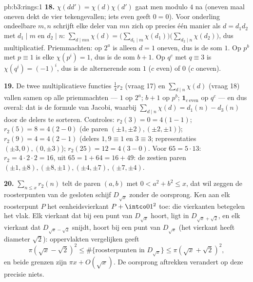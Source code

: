 \begin{solution}{pb:b3:rings:1}
\textbf{18.} $\chi(dd') = \chi(d)\chi(d')$ gaat men modulo $4$ na
(oneven maal oneven dekt de vier tekengevallen; iets even geeft $0
= 0$). Voor onderling ondeelbare $m, n$ schrijft elke deler van
$mn$ zich op precies één manier als $d = d_1d_2$ met $d_1 \mid m$
en $d_2 \mid n$: $\sum_{d \mid mn}\chi(d) = \bigl(\sum_{d_1\mid
m}\chi(d_1)\bigr)\bigl(\sum_{d_2\mid n}\chi(d_2)\bigr)$, dus
multiplicatief. Priemmachten: op $2^a$ is alleen $d = 1$ oneven,
dus is de som $1$. Op $p^b$ met $p \equiv 1$ is elke $\chi(p^i) =
1$, dus is de som $b + 1$. Op $q^c$ met $q \equiv 3$ is $\chi(q^i)
= (-1)^i$, dus is de alternerende som $1$ ($c$ even) of $0$ ($c$
oneven).

\textbf{19.} De twee multiplicatieve functies $\frac14r_2$ (vraag
17) en $\sum_{d\mid n}\chi(d)$ (vraag 18) vallen samen op alle
priemmachten --- $1$ op $2^a$; $b + 1$ op $p^b$; $\mathbf
1_{c\ \mathrm{even}}$ op $q^c$ --- en dus overal: dat is de formule
van Jacobi, waarbij $\sum_{d\mid n}\chi(d) = d_1(n) - d_3(n)$ door
de delers te sorteren. Controles: $r_2(3) = 0 = 4(1 - 1)$; $r_2(5)
= 8 = 4(2 - 0)$ (de paren $(\pm1,\pm2), (\pm2,\pm1)$); $r_2(9) = 4
= 4(2 - 1)$ (delers $1, 9 \equiv 1$ en $3 \equiv 3$; representaties
$(\pm3, 0), (0, \pm3)$); $r_2(25) = 12 = 4(3 - 0)$. Voor $65 =
5\cdot13$: $r_2 = 4\cdot2\cdot2 = 16$, uit $65 = 1 + 64 = 16 + 49$:
de zestien paren $(\pm1, \pm8), (\pm8, \pm1), (\pm4, \pm7), (\pm7,
\pm4)$.

\textbf{20.} $\sum_{n \leq x}r_2(n)$ telt de paren $(a, b)$ met $0
< a^2 + b^2 \leq x$, dat wil zeggen de roosterpunten van de
gesloten schijf $D_{\sqrt x}$ zonder de oorsprong. Ken aan elk
roosterpunt $P$ het eenheidsvierkant $P + \intco01^2$ toe: die
vierkanten betegelen het vlak. Elk vierkant dat bij een punt van
$D_{\sqrt x}$ hoort, ligt in $D_{\sqrt x + \sqrt2}$, en elk
vierkant dat $D_{\sqrt x - \sqrt 2}$ snijdt, hoort bij een punt van
$D_{\sqrt x}$ (het vierkant heeft diameter $\sqrt 2$): oppervlakten
vergelijken geeft
\[
\pi(\sqrt x - \sqrt2)^2 \leq \#\{\text{roosterpunten in }
D_{\sqrt x}\} \leq \pi(\sqrt x + \sqrt 2)^2,
\]
en beide grenzen zijn $\pi x + O(\sqrt x)$. De oorsprong aftrekken
verandert op deze precisie niets.


\end{solution}
